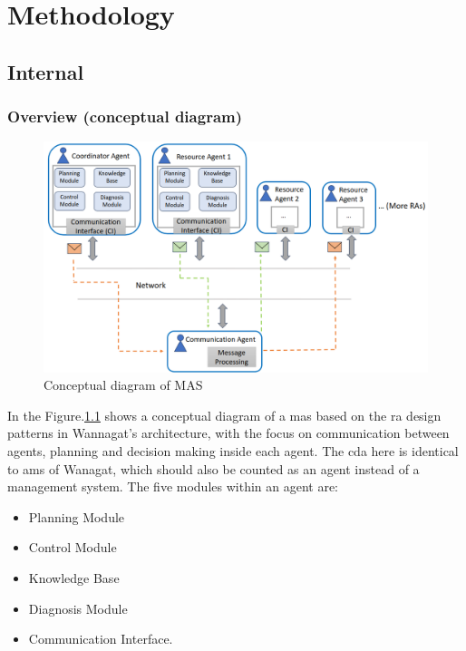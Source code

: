 \chapter{Methodology}%
\section{Internal}
\subsection{Overview (conceptual diagram)}



\begin{figure}[htb]
\includegraphics[width=16cm]{figures/MAS_Conceptual_Diagram.png}
\centering
\caption{Conceptual diagram of MAS\label{fig: MASConceptual}}
\end{figure}


In the Figure.\ref{fig: MASConceptual} shows a conceptual diagram of a \gls{mas} based on the \gls{ra} design patterns in Wannagat’s architecture, with the focus on communication between agents, planning and decision making inside each agent. The \gls{cda} here is identical to \gls{ams} of Wanagat, which should also be counted as an agent instead of a management system. The five modules within an agent are: 
\begin{itemize}
\item Planning Module
\item Control Module
\item Knowledge Base
\item Diagnosis Module
\item Communication Interface.
\end{itemize}

